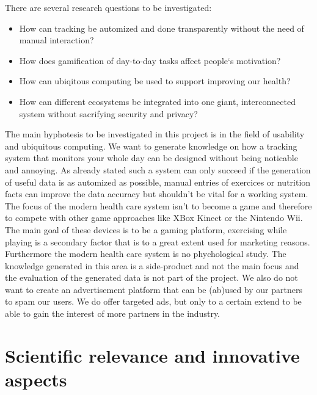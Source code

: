 \documentclass[a4paper,11pt]{article}
\providecommand*{\note}[1]{\small \textcolor{RoyalBlue}{\begin{minipage}{\textwidth}{#1}\end{minipage}}}
\begin{document}
There are several research questions to be investigated:
\begin{itemize}
	\item How can tracking be automized and done transparently without the need of manual interaction?
	\item How does gamification of day-to-day tasks affect people‘s motivation?
	\item How can ubiqitous computing be used to support improving our health?
	\item How can different ecosystems be integrated into one giant, interconnected system without sacrifying security and privacy?
\end{itemize}

The main hyphotesis to be investigated in this project is in the field of usability and ubiquitous computing. We want to generate knowledge on how a tracking system that monitors your whole day can be designed without being noticable and annoying. As already stated such a system can only succeed if the generation of useful data is as automized as possible, manual entries of exercices or nutrition facts can improve the data accuracy but shouldn't be vital for a working system. \\

The focus of the modern health care system isn't to become a game and therefore to compete with other game approaches like XBox Kinect or the Nintendo Wii. The main goal of these devices is to be a gaming platform, exercising while playing is a secondary factor that is to a great extent used for marketing reasons. Furthermore the modern health care system is no phychological study. The knowledge generated in this area is a side-product and not the main focus and the evaluation of the generated data is not part of the project. We also do not want to create an advertisement platform that can be (ab)used by our partners to spam our users. We do offer targeted ads, but only to a certain extend to be able to gain the interest of more partners in the industry.

\section{Scientific relevance and innovative aspects}
\label{sect:relevance}

\end{document}
